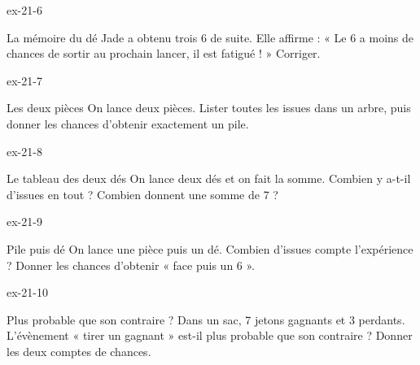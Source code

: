 \begin{blocLivre}{ex-21-6}\begin{exercice}[2]{La mémoire du dé}
Jade a obtenu trois 6 de suite. Elle affirme : « Le 6 a moins de chances de sortir au prochain lancer, il est fatigué ! » Corriger.
\end{exercice}\end{blocLivre}
\begin{blocLivre}{ex-21-7}\begin{exercice}[2]{Les deux pièces}
On lance deux pièces. Lister toutes les issues dans un arbre, puis donner les chances d’obtenir exactement un pile.
\label{fig-ex-21-7}
\end{exercice}\end{blocLivre}
\begin{blocLivre}{ex-21-8}\begin{exercice}[2]{Le tableau des deux dés}
On lance deux dés et on fait la somme. Combien y a-t-il d’issues en tout ? Combien donnent une somme de 7 ?
\label{fig-ex-21-8}
\end{exercice}\end{blocLivre}
\begin{blocLivre}{ex-21-9}\begin{exercice}[2]{Pile puis dé}
On lance une pièce puis un dé. Combien d’issues compte l’expérience ? Donner les chances d’obtenir « face puis un 6 ».
\end{exercice}\end{blocLivre}
\begin{blocLivre}{ex-21-10}\begin{exercice}[2]{Plus probable que son contraire ?}
Dans un sac, 7 jetons gagnants et 3 perdants. L’évènement « tirer un gagnant » est-il plus probable que son contraire ? Donner les deux comptes de chances.
\end{exercice}\end{blocLivre}

